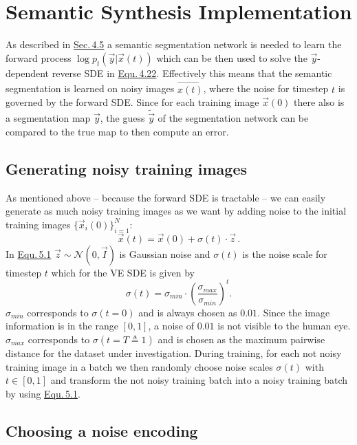 \section{Semantic Synthesis Implementation} \label{sec:5.2}
As described in \hyperref[sec:4.5]{Sec.\,4.5} a semantic segmentation network is needed to learn the forward process $\log p_t(\vec{y}|\vec{x}(t))$ which can be then used to solve the $\vec{y}$-dependent reverse SDE in \hyperref[equ:4.22]{Equ.\,4.22}. Effectively this means that the semantic segmentation is learned on noisy images $\vec{x(t)}$, where the noise for timestep $t$ is governed by the forward SDE. Since for each training image $\vec{x}(0)$ there also is a segmentation map $\vec{y}$, the guess $\tilde{\vec{y}}$ of the segmentation network can be compared to the true map to then compute an error. 

\subsection{Generating noisy training images}

As mentioned above – because the forward SDE is tractable – we can easily generate as much noisy training images as we want by adding noise to the initial training images $\{\vec{x}_i(0)\}_{i=1}^N$:
%
\begin{equation} \label{equ:5.1}
    \vec{x}(t)=\vec{x}(0)+\sigma(t)\cdot\vec{z}\,.
\end{equation}
%
In \hyperref[equ:5.1]{Equ.\,5.1} $\vec{z}\sim\mathcal{N}(0, \vec{I})$ is Gaussian noise and $\sigma(t)$ is the noise scale for timestep $t$ which for the VE SDE is given by
%
\begin{equation} \label{5.2}
    \sigma(t)=\sigma_{min}\cdot\left(\frac{\sigma_{max}}{\sigma_{min}}\right)^t.
\end{equation}
%
$\sigma_{min}$ corresponds to $\sigma(t=0)$ and is always chosen as $0.01$. Since the image information is in the range $[0,1]$, a noise of $0.01$ is not visible to the human eye. $\sigma_{max}$ corresponds to $\sigma(t=T\triangleq1)$ and is chosen as the maximum pairwise distance for the dataset under investigation. During training, for each not noisy training image in a batch we then randomly choose noise scales $\sigma(t)$ with $t\in[0,1]$ and transform the not noisy training batch into a noisy training batch by using \hyperref[equ:5.1]{Equ.\,5.1}.

\subsection{Choosing a noise encoding}

